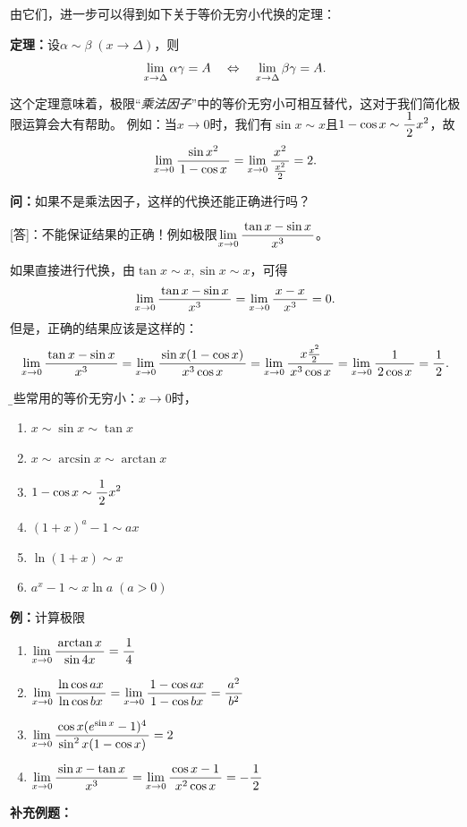 由它们，进一步可以得到如下关于等价无穷小代换的定理：

{\bf 定理：}设$\alpha\sim \beta\;(x\to\Delta)$，则
$$\limx{\Delta}\alpha\gamma=A
\quad\Leftrightarrow\quad\limx{\Delta}\beta\gamma=A.$$

这个定理意味着，极限“{\it 乘法因子}”中的等价无穷小可相互替代，这对于我们简化极限运算会大有帮助。
例如：当$x\to 0$时，我们有$\sin x\sim x$且$1-\cos x\sim\df12x^2$，故
$$\limx0\df{\sin x^2}{1-\cos x}=\limx0\df{x^2}{\frac{x^2}2}=2.$$

{\bf 问：}如果不是乘法因子，这样的代换还能正确进行吗？

[答]：不能保证结果的正确！例如极限$\limx0\df{\tan x-\sin x}{x^3}$。

如果直接进行代换，由$\tan x\sim x,\sin x\sim x$，可得
$$\limx0\df{\tan x-\sin x}{x^3}=\limx0\df{x-x}{x^3}=0.$$
但是，正确的结果应该是这样的：
$$
	\limx0\df{\tan x-\sin x}{x^3}
	=\limx0\df{\sin x(1-\cos x)}{x^3\cos x}
	=\limx0\df{x\frac{x^2}2}{x^3\cos x}
	=\limx0\df1{2\cos x}=\df12.
$$

{\b 一些常用的等价无穷小：$x\to 0$时，
\begin{enumerate}[(1)]
  \setlength{\itemindent}{1cm}
  \item $x\sim \sin x\sim \tan x$ 
  \item $x \sim\arcsin x\sim\arctan x$ 
  \item $1-\cos x\sim \df 12 x^2$ 
  \item $(1+x)^a-1\sim ax$ 
  \item $\ln(1+x)\sim x$ 
  \item $a^x-1\sim x\ln a\;(a>0)$
\end{enumerate}}

{\bf 例：}计算极限
\begin{enumerate}[(1)]
  \setlength{\itemindent}{1cm}
  \item $\limx{0}\df{\arctan x}{\sin 4x}=\df14$ 
  \item $\limx{0}\df{\ln\cos ax}{\ln\cos bx}=\limx{0}\df{1-\cos ax}{1-\cos
  bx}=\df{a^2}{b^2}$
  \item $\limx{0}\df{\cos x(e^{\sin x}-1)^4}{\sin^2 x(1-\cos x)}=2$ 
  \item $\limx{0}\df{\sin x-\tan x}{x^3}=\limx{0}\df{\cos x-1}{x^2\cos
  x}=-\df12$
\end{enumerate}

{\bf 补充例题：}


